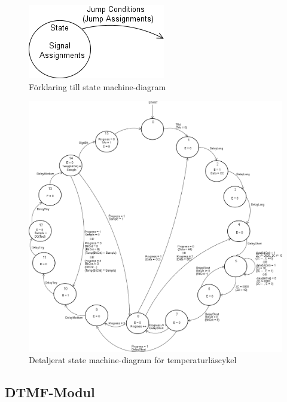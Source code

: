 \documentclass[a4paper,11pt]{article}
\begin{document}
	\begin{figure}[ht!tb]
	  \centering
	      \includegraphics[scale=0.5, angle=0]{StateMachineExplained.png}		
	  	\caption{Förklaring till state machine-diagram}	
		\label{fig:SMExp}
	\end{figure}

	\begin{figure}[ht!tb]
	  \centering
	      \includegraphics[scale=0.4, angle=0]{TempStateMachineDiagram.png}
	  	\caption{Detaljerat state machine-diagram för temperaturläscykel}
		\label{fig:TempSM}
	\end{figure}

		\subsection{DTMF-Modul}
\end{document}
